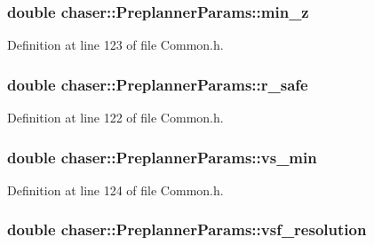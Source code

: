 \subsubsection[{\texorpdfstring{min\+\_\+z}{min_z}}]{\setlength{\rightskip}{0pt plus 5cm}double chaser\+::\+Preplanner\+Params\+::min\+\_\+z}\hypertarget{structchaser_1_1_preplanner_params_ad23cd70894c614834c2a80e35de3e373}{}\label{structchaser_1_1_preplanner_params_ad23cd70894c614834c2a80e35de3e373}


Definition at line 123 of file Common.\+h.

\subsubsection[{\texorpdfstring{r\+\_\+safe}{r_safe}}]{\setlength{\rightskip}{0pt plus 5cm}double chaser\+::\+Preplanner\+Params\+::r\+\_\+safe}\hypertarget{structchaser_1_1_preplanner_params_a409be3b01b1b4853919d5b34e529c49a}{}\label{structchaser_1_1_preplanner_params_a409be3b01b1b4853919d5b34e529c49a}


Definition at line 122 of file Common.\+h.

\subsubsection[{\texorpdfstring{vs\+\_\+min}{vs_min}}]{\setlength{\rightskip}{0pt plus 5cm}double chaser\+::\+Preplanner\+Params\+::vs\+\_\+min}\hypertarget{structchaser_1_1_preplanner_params_a2abe7915546a5d2ebde667a1d5ccfb44}{}\label{structchaser_1_1_preplanner_params_a2abe7915546a5d2ebde667a1d5ccfb44}


Definition at line 124 of file Common.\+h.

\subsubsection[{\texorpdfstring{vsf\+\_\+resolution}{vsf_resolution}}]{\setlength{\rightskip}{0pt plus 5cm}double chaser\+::\+Preplanner\+Params\+::vsf\+\_\+resolution}\hypertarget{structchaser_1_1_preplanner_params_ac30a8ee32bae78f84b863234853f6497}{}\label{structchaser_1_1_preplanner_params_ac30a8ee32bae78f84b863234853f6497}


